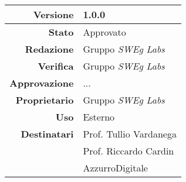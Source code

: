 \thispagestyle{empty} %

\begin{center}
\begin{tabular}{r|l}
    \textbf{Versione} & 1.0.0 \\
    \hline
    \textbf{Stato} & Approvato \\
    \hline
    \textbf{Redazione} & Gruppo \emph{SWEg Labs} \\
    \hline
    \textbf{Verifica} & Gruppo \emph{SWEg Labs} \\
    \hline
    \textbf{Approvazione} & ... \\
    \hline
    \textbf{Proprietario} & Gruppo \emph{SWEg Labs} \\
    \hline
    \textbf{Uso} & Esterno \\
    \hline
    \textbf{Destinatari} & Prof. Tullio Vardanega \\
                            & Prof. Riccardo Cardin \\
                            & AzzurroDigitale \\
\end{tabular}
\end{center}
    
